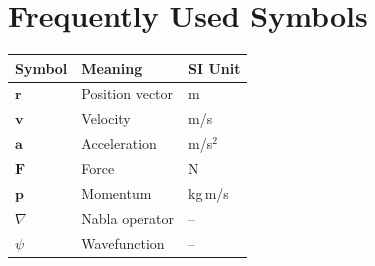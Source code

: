 \chapter*{Frequently Used Symbols}

\begin{tabular}{lll}
	\textbf{Symbol} & \textbf{Meaning} & \textbf{SI Unit}\\
	\hline
	$\mathbf r$ & Position vector & m\\
	$\mathbf v$ & Velocity & m/s\\
	$\mathbf a$ & Acceleration & m/s$^2$\\
	$\mathbf F$ & Force & N\\
	$\mathbf p$ & Momentum & kg\,m/s\\
	$\nabla$ & Nabla operator & --\\
	$\psi$ & Wavefunction & --\\
\end{tabular}

